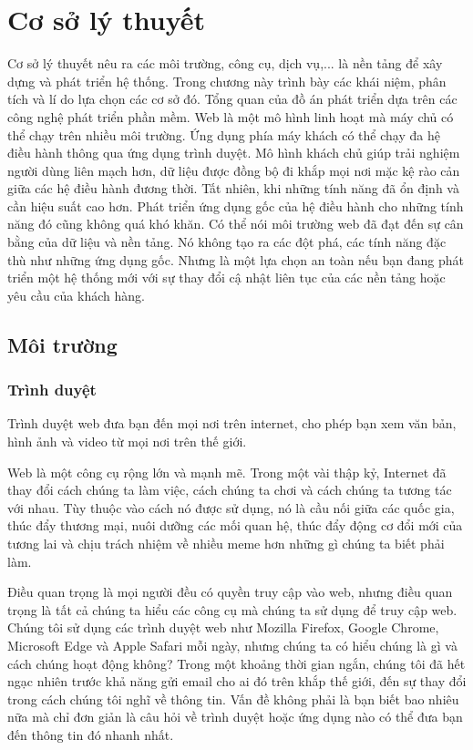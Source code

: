 \chapter{Cơ sở lý thuyết}
Cơ sở lý thuyết nêu ra các môi trường, công cụ, dịch vụ,... là nền tảng để xây dựng và phát triển hệ thống. Trong chương này trình bày các khái niệm, phân tích và lí do lựa chọn các cơ sở đó.
Tổng quan của đồ án phát triển dựa trên các công nghệ phát triển phần mềm. Web là một mô hình linh hoạt mà máy chủ có thể chạy trên nhiều môi trường. Ứng dụng phía máy khách có thể chạy đa hệ điều hành thông qua ứng dụng trình duyệt. Mô hình khách chủ giúp trải nghiệm người dùng liên mạch hơn, dữ liệu được đồng bộ đi khắp mọi nơi mặc kệ rào cản giữa các hệ điều hành đương thời.
Tất nhiên, khi những tính năng đã ổn định và cần hiệu suất cao hơn. Phát triển ứng dụng gốc của hệ điều hành cho những tính năng đó cũng không quá khó khăn.
Có thể nói môi trường web đã đạt đến sự cân bằng của dữ liệu và nền tảng. Nó không tạo ra các đột phá, các tính năng đặc thù như những ứng dụng gốc. Nhưng là một lựa chọn an toàn nếu bạn đang phát triển một hệ thống mới với sự thay đổi cậ nhật liên tục của các nền tảng hoặc yêu cầu của khách hàng.

\section{Môi trường}

\subsection{Trình duyệt \cite{web:browser:what}} \label{subsection:webclient}
Trình duyệt web đưa bạn đến mọi nơi trên internet, cho phép bạn xem văn bản, hình ảnh và video từ mọi nơi trên thế giới.

Web là một công cụ rộng lớn và mạnh mẽ. Trong một vài thập kỷ, Internet đã thay đổi cách chúng ta làm việc, cách chúng ta chơi và cách chúng ta tương tác với nhau. Tùy thuộc vào cách nó được sử dụng, nó là cầu nối giữa các quốc gia, thúc đẩy thương mại, nuôi dưỡng các mối quan hệ, thúc đẩy động cơ đổi mới của tương lai và chịu trách nhiệm về nhiều meme hơn những gì chúng ta biết phải làm.

Điều quan trọng là mọi người đều có quyền truy cập vào web, nhưng điều quan trọng là tất cả chúng ta hiểu các công cụ mà chúng ta sử dụng để truy cập web. Chúng tôi sử dụng các trình duyệt web như Mozilla Firefox, Google Chrome, Microsoft Edge và Apple Safari mỗi ngày, nhưng chúng ta có hiểu chúng là gì và cách chúng hoạt động không? Trong một khoảng thời gian ngắn, chúng tôi đã hết ngạc nhiên trước khả năng gửi email cho ai đó trên khắp thế giới, đến sự thay đổi trong cách chúng tôi nghĩ về thông tin. Vấn đề không phải là bạn biết bao nhiêu nữa mà chỉ đơn giản là câu hỏi về trình duyệt hoặc ứng dụng nào có thể đưa bạn đến thông tin đó nhanh nhất.


